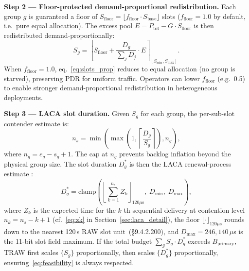 \documentclass[conference]{IEEEtran}
\begin{document}
\textbf{Step 2 --- Floor-protected demand-proportional redistribution.}
Each group $g$ is guaranteed a floor of
$S_\mathrm{floor}\!=\!\lfloor f_\mathrm{floor}\cdot S_\mathrm{base}\rfloor$
slots ($f_\mathrm{floor}\!=\!1.0$ by default, i.e.\ pure equal allocation).
The excess pool $E\!=\!P_\mathrm{tot}-G\cdot S_\mathrm{floor}$ is
then redistributed demand-proportionally:
\begin{equation}
  S_g = \left\lfloor S_\mathrm{floor} +
    \frac{D_g}{\sum_{j}D_j}\cdot E\right\rceil_{[S_\mathrm{min},S_\mathrm{max}]}.
  \label{eq:slots_prop}
\end{equation}
When $f_\mathrm{floor}\!=\!1.0$, eq.~\eqref{eq:slots_prop} reduces to
equal allocation (no group is starved), preserving PDR for uniform
traffic.
Operators can lower $f_\mathrm{floor}$ (e.g.\ 0.5) to enable stronger
demand-proportional redistribution in heterogeneous deployments.

\textbf{Step 3 --- LACA slot duration.}
Given $S_g$ for each group, the per-sub-slot contender estimate is:
\begin{equation}
  n_s = \min\!\left(\max\!\left(1,\left\lceil\frac{D_g}{S_g}\right\rceil\right),
    n_g\right),
  \label{eq:ns}
\end{equation}
where $n_g\!=\!e_g\!-\!s_g\!+\!1$.
The cap at $n_g$ prevents backlog inflation beyond the physical group
size.
The slot duration $D_g^*$ is then the LACA renewal-process estimate
\cite{taramit2023}:
\begin{equation}
  D_g^* = \mathrm{clamp}\!\left(
    \left\lfloor\sum_{k=1}^{n_s}Z_k\right\rfloor_{\!120\mu\text{s}},\;
    D_\mathrm{min},\;D_\mathrm{max}\right),
  \label{eq:laca}
\end{equation}
where $Z_k$ is the expected time for the $k$-th sequential delivery
at contention level $n_k\!=\!n_s\!-\!k\!+\!1$
(cf.~\eqref{eq:zk} in Section~\ref{sec:laca_detail}),
the floor $\lfloor\cdot\rfloor_{120\mu\text{s}}$ rounds down to the
nearest 120\,\textmu{}s RAW slot unit~(\S9.4.2.200), and
$D_\mathrm{max}\!=\!246{,}140\,\mu$s is the 11-bit slot field maximum.
If the total budget $\sum_g S_g\cdot D_g^*$ exceeds $B_\mathrm{primary}$,
TRAW first scales $\{S_g\}$ proportionally, then scales $\{D_g^*\}$
proportionally, ensuring~\eqref{eq:feasibility} is always respected.
\end{document}
